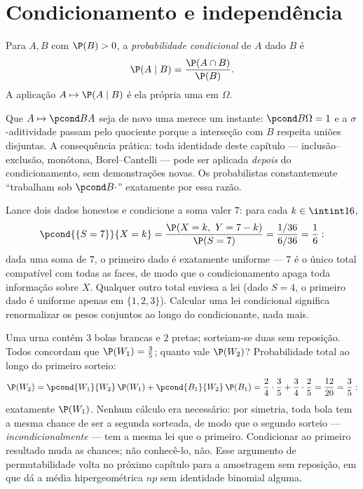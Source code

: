 \section{Condicionamento e independência}

\begin{definition}\label{def:b2:proba:conditional}
Para  $A, B$ com $\P(B) > 0$, a \emph{probabilidade
condicional} de $A$ dado $B$ é
\[
\P(A \mid B) = \frac{\P(A \cap B)}{\P(B)} .
\]
A aplicação $A \mapsto \P(A \mid B)$ é ela própria uma 
em $\Omega$.
\end{definition}

\begin{remark}
Que $A \mapsto \pcond BA$ seja de novo uma 
merece um instante: $\pcond B\Omega = 1$ e a $\sigma$-aditividade
passam pelo quociente porque a interseção com $B$
respeita uniões disjuntas. A consequência prática: toda
identidade deste capítulo --- inclusão--exclusão, 
monótona, Borel--Cantelli --- pode ser aplicada \emph{depois} do
condicionamento, sem demonstrações novas. Os probabilistas constantemente
``trabalham sob $\pcond B{\cdot}$'' exatamente por essa razão.
\end{remark}

\begin{example}\label{ex:b2:proba:sumseven}
Lance dois dados honestos e condicione a soma valer $7$: para
cada $k \in \intint16$,
\[
\pcond{\{S = 7\}}{X = k}
= \frac{\P(X = k,\ Y = 7 - k)}{\P(S = 7)}
= \frac{1/36}{6/36} = \frac16 :
\]
dada uma soma de $7$, o primeiro dado é exatamente uniforme ---
$7$ é o único total compatível com todas as faces, de modo que o
condicionamento apaga toda informação sobre $X$. Qualquer outro
total enviesa a lei (dado $S = 4$, o primeiro dado é uniforme
apenas em $\{1, 2, 3\}$). Calcular uma lei condicional significa
renormalizar os pesos conjuntos ao longo do  condicionante,
nada mais.
\end{example}

\begin{example}\label{ex:b2:proba:seconddraw}
Uma urna contém $3$ bolas brancas e $2$ pretas; sorteiam-se duas sem
reposição. Todos concordam que $\P(W_1) = \frac35$; quanto vale
$\P(W_2)$? Probabilidade total ao longo do primeiro sorteio:
\[
\P(W_2) = \pcond{W_1}{W_2}\,\P(W_1) +
\pcond{B_1}{W_2}\,\P(B_1)
= \frac24\cdot\frac35 + \frac34\cdot\frac25
= \frac{12}{20} = \frac35 :
\]
exatamente $\P(W_1)$. Nenhum cálculo era necessário: por simetria,
toda bola tem a mesma chance de ser a segunda sorteada, de modo que
o segundo sorteio --- \emph{incondicionalmente} --- tem a mesma
lei que o primeiro. Condicionar ao primeiro resultado muda
as chances; não conhecê-lo, não. Esse argumento de
permutabilidade volta no próximo capítulo para a amostragem sem
reposição, em que dá a média hipergeométrica $np$
sem identidade binomial alguma.
\end{example}

